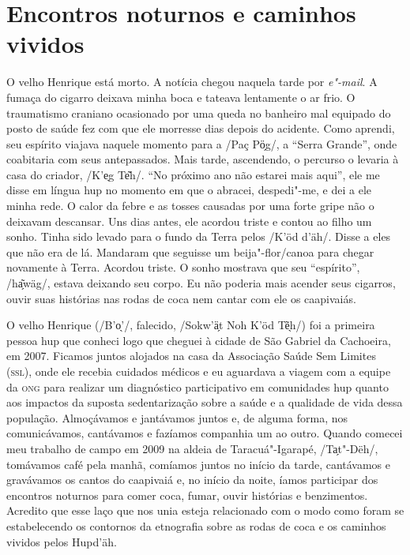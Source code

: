 
\section{Encontros noturnos e caminhos
vividos}\label{encontros-noturnos-e-caminhos-vividos}

O velho Henrique está morto. A notícia chegou naquela tarde por
\textit{e"-mail}. A fumaça do cigarro deixava minha boca e tateava
lentamente o ar frio. O traumatismo craniano ocasionado por uma queda no
banheiro mal equipado do posto de saúde fez com que ele morresse dias
depois do acidente. Como aprendi, seu espírito viajava naquele momento
para a /Paç Pö̗g/, a ``Serra Grande'', onde coabitaria com seus
antepassados. Mais tarde, ascendendo, o percurso o levaria à casa do
criador, /K'e̖g Te͂h/. ``No próximo ano não estarei mais aqui'', ele me
disse em língua hup no momento em que o abracei, despedi"-me, e dei a ele
minha rede. O calor da febre e as tosses causadas por uma forte gripe
não o deixavam descansar. Uns dias antes, ele acordou triste e contou ao
filho um sonho. Tinha sido levado para o fundo da Terra pelos /K'öd
d'äh/. Disse a eles que não era de lá. Mandaram que seguisse um
beija"-flor/canoa para chegar novamente à Terra. Acordou triste. O sonho
mostrava que seu ``espírito'', /ha̗͂wäg/, estava deixando seu corpo. Eu
não poderia mais acender seus cigarros, ouvir suas histórias nas rodas
de coca nem cantar com ele os caapivaiás.

O velho Henrique (/B'o̖'/, falecido, /Sokw'ä̗t Noh K'öd Tẽ̖h/) foi
a primeira pessoa hup que conheci logo que cheguei à cidade de São
Gabriel da Cachoeira, em 2007. Ficamos juntos alojados na casa da
Associação Saúde Sem Limites (\textsc{ssl}), onde ele recebia cuidados médicos e
eu aguardava a viagem com a equipe da \textsc{ong} para realizar um diagnóstico
participativo em comunidades hup quanto aos impactos da suposta
sedentarização sobre a saúde e a qualidade de vida dessa população.
Almoçávamos e jantávamos juntos e, de alguma forma, nos comunicávamos,
cantávamos e fazíamos companhia um ao outro. Quando comecei meu trabalho
de campo em 2009 na aldeia de Taracuá"-Igarapé, /Ta̗t"-Dëh/, tomávamos café
pela manhã, comíamos juntos no início da tarde, cantávamos e gravávamos
os cantos do caapivaiá e, no início da noite, íamos participar dos
encontros noturnos para comer coca, fumar, ouvir histórias e
benzimentos. Acredito que esse laço que nos unia esteja relacionado com
o modo como foram se estabelecendo os contornos da etnografia sobre as
rodas de coca e os caminhos vividos pelos Hupd'äh.

